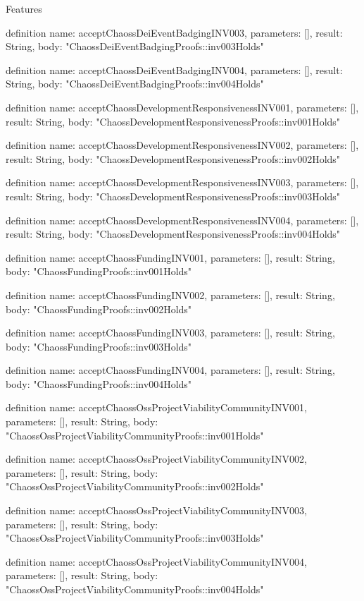 \begin{lexlean}{Features}
\begin{semanticmodule}
definition{
  name: acceptChaossDeiEventBadgingINV003,
  parameters: [],
  result: String,
  body: "ChaossDeiEventBadgingProofs::inv003Holds"
}

definition{
  name: acceptChaossDeiEventBadgingINV004,
  parameters: [],
  result: String,
  body: "ChaossDeiEventBadgingProofs::inv004Holds"
}

definition{
  name: acceptChaossDevelopmentResponsivenessINV001,
  parameters: [],
  result: String,
  body: "ChaossDevelopmentResponsivenessProofs::inv001Holds"
}

definition{
  name: acceptChaossDevelopmentResponsivenessINV002,
  parameters: [],
  result: String,
  body: "ChaossDevelopmentResponsivenessProofs::inv002Holds"
}

definition{
  name: acceptChaossDevelopmentResponsivenessINV003,
  parameters: [],
  result: String,
  body: "ChaossDevelopmentResponsivenessProofs::inv003Holds"
}

definition{
  name: acceptChaossDevelopmentResponsivenessINV004,
  parameters: [],
  result: String,
  body: "ChaossDevelopmentResponsivenessProofs::inv004Holds"
}

definition{
  name: acceptChaossFundingINV001,
  parameters: [],
  result: String,
  body: "ChaossFundingProofs::inv001Holds"
}

definition{
  name: acceptChaossFundingINV002,
  parameters: [],
  result: String,
  body: "ChaossFundingProofs::inv002Holds"
}

definition{
  name: acceptChaossFundingINV003,
  parameters: [],
  result: String,
  body: "ChaossFundingProofs::inv003Holds"
}

definition{
  name: acceptChaossFundingINV004,
  parameters: [],
  result: String,
  body: "ChaossFundingProofs::inv004Holds"
}

definition{
  name: acceptChaossOssProjectViabilityCommunityINV001,
  parameters: [],
  result: String,
  body: "ChaossOssProjectViabilityCommunityProofs::inv001Holds"
}

definition{
  name: acceptChaossOssProjectViabilityCommunityINV002,
  parameters: [],
  result: String,
  body: "ChaossOssProjectViabilityCommunityProofs::inv002Holds"
}

definition{
  name: acceptChaossOssProjectViabilityCommunityINV003,
  parameters: [],
  result: String,
  body: "ChaossOssProjectViabilityCommunityProofs::inv003Holds"
}

definition{
  name: acceptChaossOssProjectViabilityCommunityINV004,
  parameters: [],
  result: String,
  body: "ChaossOssProjectViabilityCommunityProofs::inv004Holds"
}


\end{semanticmodule}
\end{lexlean}
